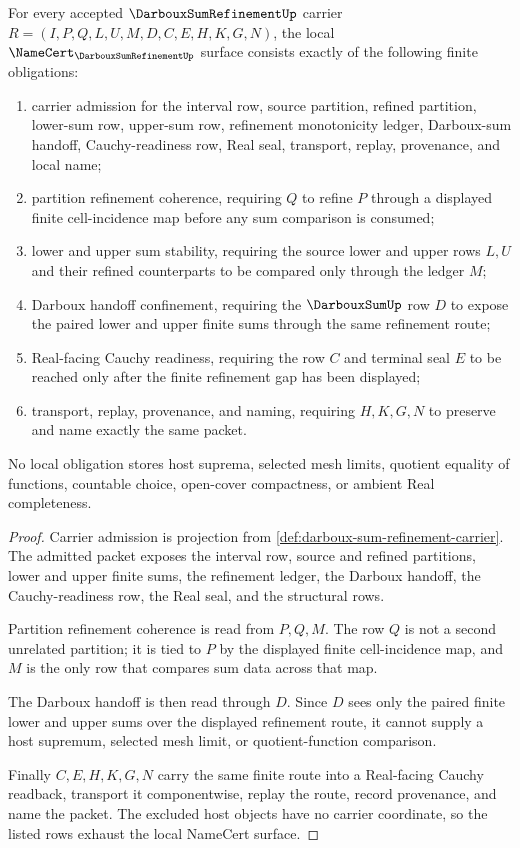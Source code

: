 \begin{theorem}
\label{thm:darboux-sum-refinement-namecert-obligations}
For every accepted $\DarbouxSumRefinementUp$ carrier $R=(I,P,Q,L,U,M,D,C,E,H,K,G,N)$, the local $\NameCert_{\DarbouxSumRefinementUp}$ surface consists exactly of the following finite obligations:
\begin{enumerate}
\item carrier admission for the interval row, source partition, refined partition, lower-sum row, upper-sum row, refinement monotonicity ledger, Darboux-sum handoff, Cauchy-readiness row, Real seal, transport, replay, provenance, and local name;
\item partition refinement coherence, requiring $Q$ to refine $P$ through a displayed finite cell-incidence map before any sum comparison is consumed;
\item lower and upper sum stability, requiring the source lower and upper rows $L,U$ and their refined counterparts to be compared only through the ledger $M$;
\item Darboux handoff confinement, requiring the $\DarbouxSumUp$ row $D$ to expose the paired lower and upper finite sums through the same refinement route;
\item Real-facing Cauchy readiness, requiring the row $C$ and terminal seal $E$ to be reached only after the finite refinement gap has been displayed;
\item transport, replay, provenance, and naming, requiring $H,K,G,N$ to preserve and name exactly the same packet.
\end{enumerate}
No local obligation stores host suprema, selected mesh limits, quotient equality of functions, countable choice, open-cover compactness, or ambient Real completeness.
\end{theorem}
\begin{proof}
Carrier admission is projection from \autoref{def:darboux-sum-refinement-carrier}. The admitted packet exposes the interval row, source and refined partitions, lower and upper finite sums, the refinement ledger, the Darboux handoff, the Cauchy-readiness row, the Real seal, and the structural rows.

Partition refinement coherence is read from $P,Q,M$. The row $Q$ is not a second unrelated partition; it is tied to $P$ by the displayed finite cell-incidence map, and $M$ is the only row that compares sum data across that map.

The Darboux handoff is then read through $D$. Since $D$ sees only the paired finite lower and upper sums over the displayed refinement route, it cannot supply a host supremum, selected mesh limit, or quotient-function comparison.

Finally $C,E,H,K,G,N$ carry the same finite route into a Real-facing Cauchy readback, transport it componentwise, replay the route, record provenance, and name the packet. The excluded host objects have no carrier coordinate, so the listed rows exhaust the local NameCert surface.
\end{proof}

